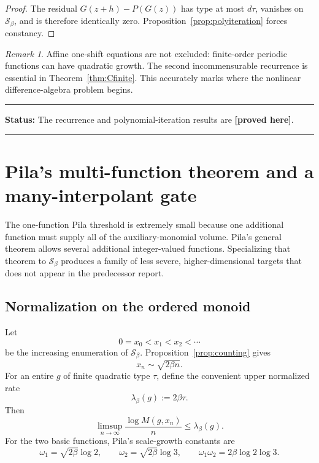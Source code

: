 \documentclass[11pt,oneside]{article}
\theoremstyle{definition}
\theoremstyle{remark}
\newtheorem{remark}[theorem]{Remark}
\newcommand{\Sbeta}{\mathcal S_\beta}
\newcommand{\statusproved}{\textcolor{provedgreen}{\textbf{[proved here]}}}
\newenvironment{statusbox}[1]
{\begin{center}\begin{minipage}{0.94\textwidth}\raggedright\hrule\vspace{0.45em}\textbf{Status:} #1\par\vspace{0.35em}}
{\vspace{0.35em}\hrule\end{minipage}\end{center}}
\begin{document}
\begin{proof}
The residual $G(z+h)-P(G(z))$ has type at most $d\tau$, vanishes on $\Sbeta$, and is
therefore identically zero.  Proposition~\ref{prop:polyiteration} forces constancy.
\end{proof}

\begin{remark}
Affine one-shift equations are not excluded: finite-order periodic functions can have
quadratic growth.  The second incommensurable recurrence is essential in
Theorem~\ref{thm:Cfinite}.  This accurately marks where the nonlinear difference-algebra
problem begins.
\end{remark}

\begin{statusbox}{The recurrence and polynomial-iteration results are \statusproved.}
\end{statusbox}

\section{Pila's multi-function theorem and a many-interpolant gate}
\label{sec:multipila}

The one-function Pila threshold is extremely small because one additional function must
supply all of the auxiliary-monomial volume.  Pila's general theorem allows several
additional integer-valued functions.  Specializing that theorem to $\Sbeta$ produces a
family of less severe, higher-dimensional targets that does not appear in the predecessor
report.

\subsection{Normalization on the ordered monoid}

Let
\[
 0=x_0<x_1<x_2<\cdots
\]
be the increasing enumeration of $\Sbeta$.  Proposition~\ref{prop:counting} gives
\begin{equation}
 x_n\sim\sqrt{2\beta n}.
 \label{eq:xnasymp}
\end{equation}
For an entire $g$ of finite quadratic type $\tau$, define the convenient upper normalized
rate
\begin{equation}
 \lambda_\beta(g):=2\beta\tau.
 \label{eq:lambdanorm}
\end{equation}
Then
\[
 \limsup_{n\to\infty}\frac{\log M(g,x_n)}n
 \le\lambda_\beta(g).
\]
For the two basic functions, Pila's scale-growth constants are
\[
 \omega_1=\sqrt{2\beta}\log2,
 \qquad
 \omega_2=\sqrt{2\beta}\log3,
 \qquad
 \omega_1\omega_2=2\beta\log2\log3.
\]
\end{document}
